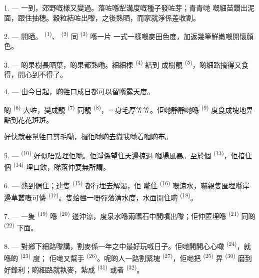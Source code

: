 1. --- 一到，郊野嘅樣又變過。落咗喺犁溝度嘅種子發咗芽；青青哋
嘅細苗鑽出泥面，跟住抽穗。穀粒結咗出嚟，之後熟晒，而家就淨係差收割。

2. --- 開晒。 \textsuperscript{(1)}、
 \textsuperscript{(2)} 同 \textsuperscript{(3)} 喺一片
一式一樣嘅麥田色度，加返幾筆鮮嫩嘅開懷顏色。

3. --- 啲果樹長晒葉，啲果都熟嘞。細細棵 \textsuperscript{(4)} 結到
成樹靚 \textsuperscript{(5)}，啲細路摘得又食得，開心到不得了。

4. --- 由今日起，啲牲口成日都可以留喺露天度。

啲 \textsuperscript{(6)} 大咗，變成靚 \textsuperscript{(7)} 同靚
 \textsuperscript{(8)}，一身毛厚笠笠。佢哋靜靜哋喺
\textsuperscript{(9)} 度食成塊地畀點到花花斑斑。

好快就要幫牲口剪毛嘞，攞佢哋啲去織我哋着嗰啲布。

\VUsaut{5.0mm}
\VUsaut{3.4mm}

5. ---  \textsuperscript{(10)} 好似唔點理佢哋。佢淨係望住天邊掠過
嗰場風暴。至於個 \textsuperscript{(13)}，佢揞住個
\textsuperscript{(14)} 埋口飲，睇落仲要無所謂。

6. --- 熱到侷住；連隻 \textsuperscript{(15)} 都行埋去解渴，佢
𠹌住 \textsuperscript{(16)} 嘅涼水，嚇親隻匿埋喺岸邊草叢嘅可憐
\textsuperscript{(17)}。隻蛤乸一嘢彈落清水度，水面開住啲
\textsuperscript{(18)}。

7. --- 一隻 \textsuperscript{(19)} 喺 \textsuperscript{(20)}
邊沖涼，度泉水喺兩嚿石中間噴出嚟；佢仲匿埋喺
\textsuperscript{(21)} 同啲 \textsuperscript{(22)} 下面。

\VUsaut{5.0mm}
\VUsaut{3.4mm}

8. --- 對鄉下細路嚟講，割麥係一年之中最好玩嘅日子。佢哋開開心心噉
\textsuperscript{(24)}，就喺啲 \textsuperscript{(23)} 度；
佢哋又幫手 \textsuperscript{(26)}。呢啲人一路割緊塊
\textsuperscript{(27)}，佢哋把 \textsuperscript{(25)} 畀
\textsuperscript{(30)} 磨到好鋒利；啲細路就執麥，紮成
\textsuperscript{(31)} 或者 \textsuperscript{(32)}。

